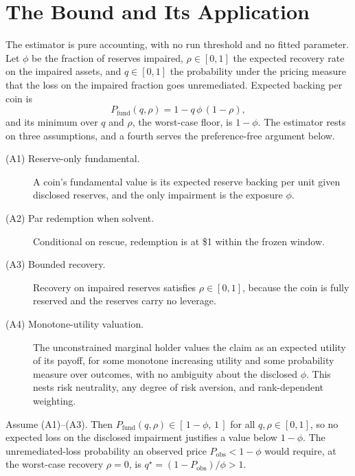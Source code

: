 \section{The Bound and Its Application}
\label{sec:ident}

The estimator is pure accounting, with no run threshold and no fitted parameter. Let
$\phi$ be the fraction of reserves impaired, $\rho\in[0,1]$ the expected recovery rate on
the impaired assets, and $q\in[0,1]$ the probability under the pricing measure that the
loss on the impaired fraction goes unremediated. Expected backing per coin is
\begin{equation}
P_{\mathrm{fund}}(q,\rho) = 1 - q\,\phi\,(1-\rho),
\end{equation}
and its minimum over $q$ and $\rho$, the worst-case floor, is $1-\phi$. The estimator
rests on three assumptions, and a fourth serves the preference-free argument below.

\begin{description}
\item[(A1) Reserve-only fundamental.] A coin's fundamental value is its expected reserve
  backing per unit given disclosed reserves, and the only impairment is the
  exposure $\phi$.
\item[(A2) Par redemption when solvent.] Conditional on rescue, redemption is at \$1
  within the frozen window.
\item[(A3) Bounded recovery.] Recovery on impaired reserves satisfies $\rho\in[0,1]$,
  because the coin is fully reserved and the reserves carry no leverage.
\item[(A4) Monotone-utility valuation.] The unconstrained marginal holder values the claim
  as an expected utility of its payoff, for some monotone increasing utility and some
  probability measure over outcomes, with no ambiguity about the disclosed $\phi$. This nests risk neutrality, any degree of risk
  aversion, and rank-dependent weighting.
\end{description}

\begin{proposition}
\label{prop:floor}
Assume \textup{(A1)--(A3)}. Then
$P_{\mathrm{fund}}(q,\rho)\in[\,1-\phi,\,1\,]$ for all $q,\rho\in[0,1]$, so no expected
loss on the disclosed impairment justifies a value below $1-\phi$. The unremediated-loss
probability an observed price $P_{\mathrm{obs}}<1-\phi$ would require, at the worst-case
recovery $\rho=0$, is $q^{\star}=(1-P_{\mathrm{obs}})/\phi>1$.
\end{proposition}

